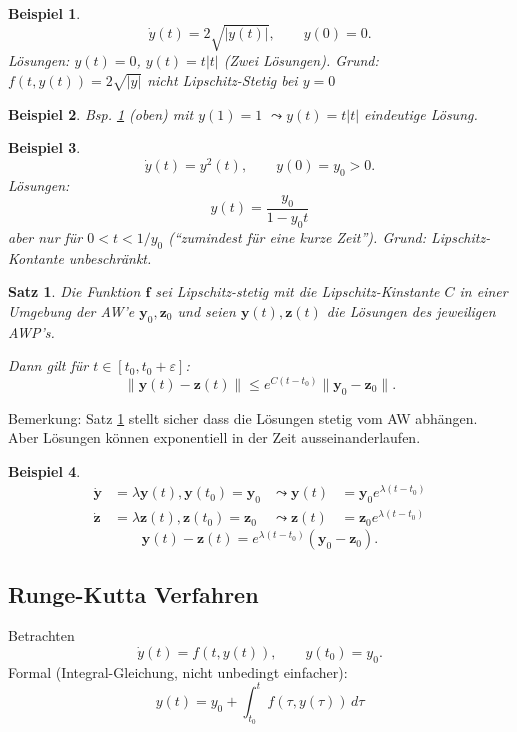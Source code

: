 \documentclass[a4paper]{article}
\newtheorem{thm}{Satz}
\newtheorem{bsp}{Beispiel}
\renewcommand{\vec}[1]{\mathbf{\bm{#1}}}
\begin{document}
\begin{bsp} \label{bsp:dgl-eindeutig-8}
  \[
    \dot{y}(t) = 2\sqrt{|y(t)|}, \qquad y(0) = 0.
  \]
  Lösungen: $y(t) = 0$, $y(t) = t |t|$ (Zwei Lösungen).
  Grund: $f(t, y(t)) = 2\sqrt{|y|}$ nicht Lipschitz-Stetig bei $y=0$
\end{bsp}
\begin{bsp}
  Bsp. \ref{bsp:dgl-eindeutig-8} (oben) mit $y(1) = 1$ $\leadsto y(t) = t|t|$
  eindeutige Lösung.
\end{bsp}
\begin{bsp}
  \[
    \dot{y}(t) = y^2(t), \qquad
    y(0) = y_0 > 0.
  \]
  Lösungen:
  \[
    y(t) = \frac{y_0}{1-y_0 t}
  \]
  aber nur für $0 < t < 1/y_0$ (``zumindest für eine kurze Zeit'').
  Grund: Lipschitz-Kontante unbeschränkt.
\end{bsp}

\begin{thm}
  \label{thm:lipschitz-stetig-distanz}
  Die Funktion $\vec{f}$ sei Lipschitz-stetig mit die Lipschitz-Kinstante $C$
  in einer Umgebung der AW'e $\vec{y}_0, \vec{z}_0$ und seien $\vec{y}(t),
  \vec{z}(t)$ die Lösungen des jeweiligen AWP's.

  Dann gilt für $t \in [t_0, t_0 + \varepsilon]$:
  \[
    \|\vec{y}(t) - \vec{z}(t)\|
    \leq e^{C(t-t_0)} \|\vec{y}_0 - \vec{z}_0\|.
  \]
\end{thm}

Bemerkung: Satz \ref{thm:lipschitz-stetig-distanz} stellt sicher dass die
Lösungen stetig vom AW abhängen. Aber Lösungen können exponentiell in der Zeit
ausseinanderlaufen.

\begin{bsp}
  \begin{align*}
    \dot{\vec{y}} &= \lambda \vec{y}(t), \vec{y}(t_0) = \vec{y}_0 
      &\leadsto \vec{y}(t) &= \vec{y}_0 e^{\lambda (t-t_0)} \\
    \dot{\vec{z}} &= \lambda \vec{z}(t), \vec{z}(t_0) = \vec{z}_0 
      &\leadsto \vec{z}(t) &= \vec{z}_0 e^{\lambda (t-t_0)}
  \end{align*}
  \[
    \vec{y}(t) - \vec{z}(t) = e^{\lambda (t-t_0)} (\vec{y}_0 - \vec{z}_0).
  \]
\end{bsp}

\subsection{Runge-Kutta Verfahren}

Betrachten
\[
  \dot{y}(t) = f(t, y(t)), \qquad
  y(t_0) = y_0.
\]
Formal (Integral-Gleichung, nicht unbedingt einfacher):
\[
  y(t) = y_0 + \int_{t_0}^t f(\tau, y(\tau)) \, d\tau
\]
\end{document}
